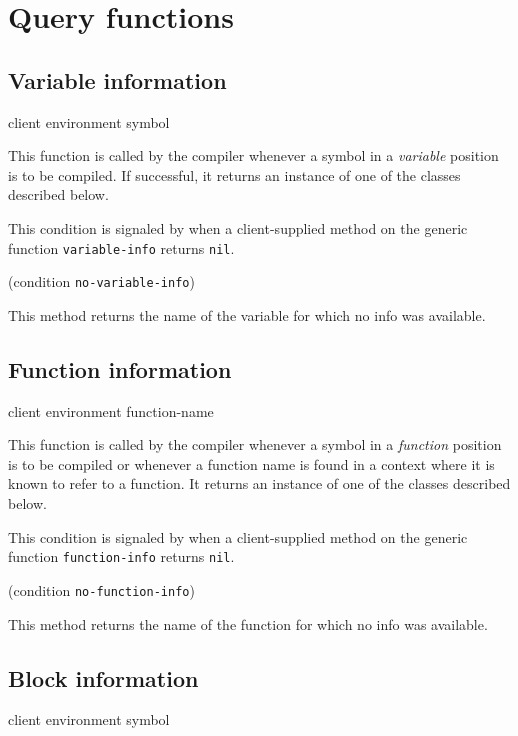 \section{Query functions}

\subsection{Variable information}

 {client environment symbol}

This function is called by the compiler whenever a symbol in a
\emph{variable} position is to be compiled.  If successful, it returns
an instance of one of the classes described below.


This condition is signaled by \sysname{} when a client-supplied method
on the generic function \texttt{variable-info} returns \texttt{nil}.

 {(condition {\tt no-variable-info})}

This method returns the name of the variable for which no info was
available.

\subsection{Function information}

 {client environment function-name}

This function is called by the compiler whenever a symbol in a
\emph{function} position is to be compiled or whenever a function name
is found in a context where it is known to refer to a function.  It
returns an instance of one of the classes described below.


This condition is signaled by \sysname{} when a client-supplied method
on the generic function \texttt{function-info} returns \texttt{nil}.

 {(condition {\tt no-function-info})}

This method returns the name of the function for which no info was
available.

\subsection{Block information}

 {client environment symbol}

